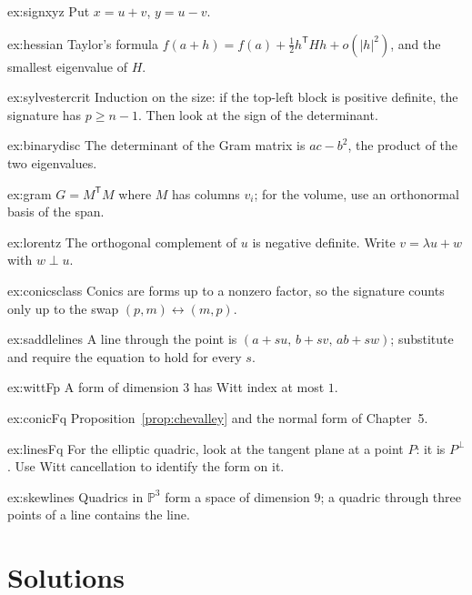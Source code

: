 \begin{hint}{ex:signxyz}
Put $x=u+v$, $y=u-v$.
\end{hint}
\begin{hint}{ex:hessian}
Taylor's formula $f(a+h)=f(a)+\frac12h^{\mathsf T}Hh+o(|h|^2)$, and the smallest eigenvalue of $H$.
\end{hint}
\begin{hint}{ex:sylvestercrit}
Induction on the size: if the top-left block is positive definite, the signature has $p\ge n-1$. Then look at the sign of the determinant.
\end{hint}
\begin{hint}{ex:binarydisc}
The determinant of the Gram matrix is $ac-b^2$, the product of the two eigenvalues.
\end{hint}
\begin{hint}{ex:gram}
$G=M^{\mathsf T}M$ where $M$ has columns $v_i$; for the volume, use an orthonormal basis of the span.
\end{hint}
\begin{hint}{ex:lorentz}
The orthogonal complement of $u$ is negative definite. Write $v=\lambda u+w$ with $w\perp u$.
\end{hint}
\begin{hint}{ex:conicsclass}
Conics are forms up to a nonzero factor, so the signature counts only up to the swap $(p,m)\leftrightarrow(m,p)$.
\end{hint}
\begin{hint}{ex:saddlelines}
A line through the point is $(a+su,\,b+sv,\,ab+sw)$; substitute and require the equation to hold for every $s$.
\end{hint}
\begin{hint}{ex:wittFp}
A form of dimension $3$ has Witt index at most $1$.
\end{hint}
\begin{hint}{ex:conicFq}
Proposition~\ref{prop:chevalley} and the normal form of Chapter~5.
\end{hint}
\begin{hint}{ex:linesFq}
For the elliptic quadric, look at the tangent plane at a point $P$: it is $P^\perp$. Use Witt cancellation to identify the form on it.
\end{hint}
\begin{hint}{ex:skewlines}
Quadrics in $\mathbb P^3$ form a space of dimension $9$; a quadric through three points of a line contains the line.
\end{hint}

\section{Solutions}


